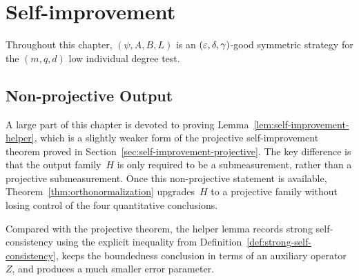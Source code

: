 \chapter{Self-improvement}
\label{chap:self-improvement}

Throughout this chapter, $(\psi,A,B,L)$ is an $(\varepsilon,\delta,\gamma)$-good symmetric strategy for the $(m,q,d)$ low individual degree test.

\section{Non-projective Output}
\label{sec:self-improvement}

A large part of this chapter is devoted to proving
Lemma~\ref{lem:self-improvement-helper}, which is a slightly weaker form of the
projective self-improvement theorem proved in Section~\ref{sec:self-improvement-projective}.
The key difference is that the output family~$H$ is only required to be a
submeasurement, rather than a projective submeasurement. Once this non-projective
statement is available, Theorem~\ref{thm:orthonormalization} upgrades~$H$ to a
projective family without losing control of the four quantitative conclusions.

Compared with the projective theorem, the helper lemma records strong
self-consistency using the explicit inequality from
Definition~\ref{def:strong-self-consistency}, keeps the boundedness conclusion in
terms of an auxiliary operator~$Z$, and produces a much smaller error parameter.

